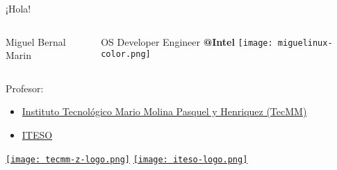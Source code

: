 
\begin{frame}[c]{¡Hola!}

  \begin{columns}
      Miguel Bernal Marin

      \vspace{\baselineskip}
      OS Developer Engineer \textbf{@Intel}
      \texttt{[image: miguelinux-color.png]}
  \end{columns}

  Profesor:
  \begin{itemize}
    \item \href{http://tecmm.edu.mx/}{Instituto Tecnológico Mario
      Molina Pasquel y Henriquez (TecMM)}
    \item \href{https://iteso.mx/}{ITESO}
  \end{itemize}

  \begin{center}
    \href{http://tecmm.edu.mx/}{\texttt{[image: tecmm-z-logo.png]}}
    \hspace{2cm}
    \href{https://iteso.mx/}{\texttt{[image: iteso-logo.png]}}
  \end{center}
\end{frame}
